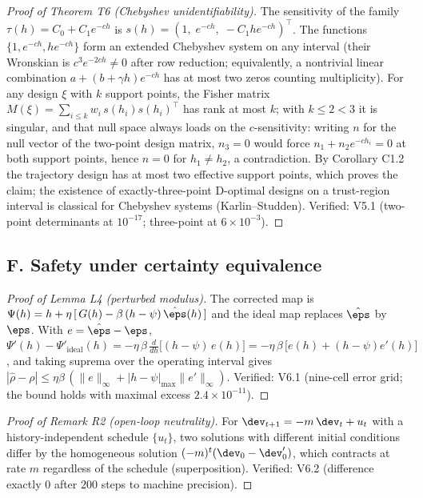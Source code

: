 \documentclass[11pt]{article}
\begin{document}
\begin{proof}[Proof of Theorem T6 (Chebyshev unidentifiability)]
The sensitivity of the family $\tau(h) = C_0 + C_1 e^{-ch}$ is
$s(h) = (1,\; e^{-ch},\; -C_1 h e^{-ch})^\top$. The functions
$\{1, e^{-ch}, h e^{-ch}\}$ form an extended Chebyshev system on any
interval (their Wronskian is $c^3 e^{-2ch} \ne 0$ after row reduction;
equivalently, a nontrivial linear combination
$a + (b + \gamma h)e^{-ch}$ has at most two zeros counting multiplicity).
For any design $\xi$ with $k$ support points, the Fisher matrix
$M(\xi) = \sum_{i\le k} w_i\, s(h_i) s(h_i)^\top$ has rank at most $k$;
with $k \le 2 < 3$ it is singular, and that null space always loads on
the $c$-sensitivity: writing $n$ for the null vector of the two-point
design matrix, $n_3 = 0$ would force $n_1 + n_2 e^{-ch_i} = 0$ at both
support points, hence $n = 0$ for $h_1 \neq h_2$, a contradiction. By
Corollary C1.2 the trajectory design has at most two effective support
points, which proves the claim; the existence of exactly-three-point
D-optimal designs on a trust-region interval is classical for Chebyshev
systems (Karlin--Studden). Verified: V5.1 (two-point determinants at
$10^{-17}$; three-point at $6\times 10^{-3}$).
\end{proof}

\subsection*{F. Safety under certainty equivalence}

\begin{proof}[Proof of Lemma L4 (perturbed modulus)]
The corrected map is $\Psi(h) = h + \eta\,[\,G(h) - \beta\,(h-\psi)\,
\hat\eps(h)\,]$ and the ideal map replaces $\hat\eps$ by $\eps$. With
$e = \hat\eps - \eps$,
$\Psi'(h) - \Psi'_{\mathrm{ideal}}(h) = -\eta\,\beta\,\tfrac{d}{dh}
\big[(h-\psi)\,e(h)\big] = -\eta\,\beta\,\big[e(h) + (h-\psi)e'(h)\big]$,
and taking suprema over the operating interval gives
$|\hat\rho - \rho| \le \eta\beta\,(\|e\|_\infty + |h-\psi|_{\max}
\|e'\|_\infty)$. Verified: V6.1 (nine-cell error grid; the bound holds
with maximal excess $2.4\times10^{-11}$).
\end{proof}

\begin{proof}[Proof of Remark R2 (open-loop neutrality)]
For $\dev_{t+1} = -m\,\dev_t + u_t$ with a history-independent schedule
$\{u_t\}$, two solutions with different initial conditions differ by the
homogeneous solution $(-m)^t(\dev_0 - \dev_0')$, which contracts at rate
$m$ regardless of the schedule (superposition). Verified: V6.2 (difference
exactly $0$ after $200$ steps to machine precision).
\end{proof}
\end{document}

